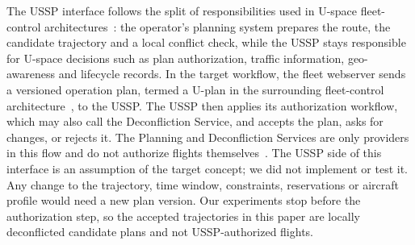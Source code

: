 The USSP interface follows the split of responsibilities used in U-space fleet-control architectures~\cite{nagel2026microservice}: the operator's planning system prepares the route, the candidate trajectory and a local conflict check, while the USSP stays responsible for U-space decisions such as plan authorization, traffic information, geo-awareness and lifecycle records. In the target workflow, the fleet webserver sends a versioned operation plan, termed a U-plan in the surrounding fleet-control architecture~\cite{nagel2026microservice}, to the USSP. The USSP then applies its authorization workflow, which may also call the Deconfliction Service, and accepts the plan, asks for changes, or rejects it. The Planning and Deconfliction Services are only providers in this flow and do not authorize flights themselves~\cite{nagel2026microservice}. The USSP side of this interface is an assumption of the target concept; we did not implement or test it. Any change to the trajectory, time window, constraints, reservations or aircraft profile would need a new plan version. Our experiments stop before the authorization step, so the accepted trajectories in this paper are locally deconflicted candidate plans and not USSP-authorized flights.

